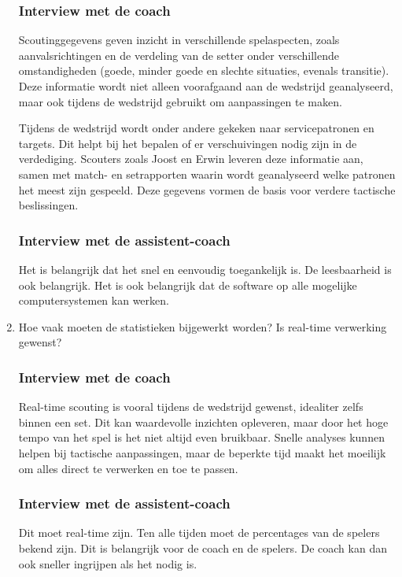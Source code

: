 \begin{enumerate}
  \subsubsection{Interview met de coach}
  Scoutinggegevens geven inzicht in verschillende spelaspecten, zoals aanvalsrichtingen en de verdeling van de setter onder verschillende omstandigheden (goede, minder goede en slechte situaties, evenals transitie). Deze informatie wordt niet alleen voorafgaand aan de wedstrijd geanalyseerd, maar ook tijdens de wedstrijd gebruikt om aanpassingen te maken.

  Tijdens de wedstrijd wordt onder andere gekeken naar servicepatronen en targets. Dit helpt bij het bepalen of er verschuivingen nodig zijn in de verdediging. Scouters zoals Joost en Erwin leveren deze informatie aan, samen met match- en setrapporten waarin wordt geanalyseerd welke patronen het meest zijn gespeeld. Deze gegevens vormen de basis voor verdere tactische beslissingen.
  \subsubsection{Interview met de assistent-coach}
  Het is belangrijk dat het snel en eenvoudig toegankelijk is. De leesbaarheid is ook belangrijk. Het is ook belangrijk dat de software op alle mogelijke computersystemen kan werken.
  \item Hoe vaak moeten de statistieken bijgewerkt worden? Is real-time verwerking gewenst?
  \subsubsection{Interview met de coach}
  Real-time scouting is vooral tijdens de wedstrijd gewenst, idealiter zelfs binnen een set. Dit kan waardevolle inzichten opleveren, maar door het hoge tempo van het spel is het niet altijd even bruikbaar. Snelle analyses kunnen helpen bij tactische aanpassingen, maar de beperkte tijd maakt het moeilijk om alles direct te verwerken en toe te passen.
  \subsubsection{Interview met de assistent-coach}
  Dit moet real-time zijn. Ten alle tijden moet de percentages van de spelers bekend zijn. Dit is belangrijk voor de coach en de spelers. De coach kan dan ook sneller ingrijpen als het nodig is.
\end{enumerate}

